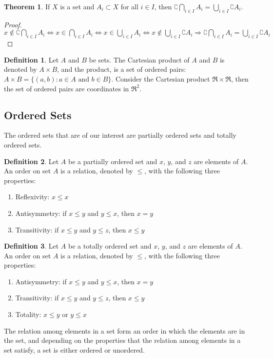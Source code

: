 \documentclass[12pt,a4paper]{article}
\theoremstyle{definition}
\newtheorem{defn}{Definition}[section]
\newtheorem{thm}{Theorem}[section]
\begin{document}
\begin{thm}
If $X$ is a set and $A_i \subset X$ for all $i \in I$, then $\complement
\bigcap_{i \in I} A_i = \bigcup_{i \in I} \complement A_i$.
\begin{proof}
$x \notin \complement \bigcap_{i \in I} A_i \Leftrightarrow x \in \bigcap_{i
\in I} A_i \Leftrightarrow x \in \bigcup_{i \in I} A_i \Leftrightarrow x \notin
\bigcup_{i \in I} \complement A_i \Rightarrow \complement \bigcap_{i \in I} A_i
= \bigcup_{i \in I} \complement A_i$
\end{proof}
\end{thm}

\begin{defn}
Let $A$ and $B$ be sets. The Cartesian product of $A$ and $B$ is denoted by $A
\times B$, and the product, is a set of ordered pairs: $A \times B = \{ (a, b)
: a \in A \text{ and } b \in B \}$. Consider the Cartesian product $\Re \times
\Re$, then the set of ordered pairs are coordinates in $\Re^2$.
\end{defn}

\subsection{Ordered Sets}
The ordered sets that are of our interest are partially ordered sets and
totally ordered sets.
\begin{defn}
Let $A$ be a partially ordered set and $x$, $y$, and $z$ are elements of $A$.
An order on set $A$ is a relation, denoted by $\leq$, with the following three
properties:
\begin{enumerate}
\item Reflexivity: $x \leq x$ 
\item Antisymmetry: if $x \leq y$ and $y \leq x$, then $x = y$
\item Transitivity: if $x \leq y$ and $y \leq z$, then $x \leq y$
\end{enumerate}
\end{defn}
\begin{defn}
Let $A$ be a totally ordered set and $x$, $y$, and $z$ are elements of $A$.
An order on set $A$ is a relation, denoted by $\leq$, with the following three
properties:
\begin{enumerate}
\item Antisymmetry: if $x \leq y$ and $y \leq x$, then $x = y$
\item Transitivity: if $x \leq y$ and $y \leq z$, then $x \leq y$
\item Totality: $x \leq y$ or $y \leq x$
\end{enumerate}
\end{defn}
The relation among elements in a set form an order in which the elements are in
the set, and depending on the properties that the relation among elements in a
set satisfy, a set is either ordered or unordered.
\end{document}
